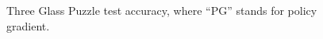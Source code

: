 	
	\begin{figure}[t!]
		\centering
		\caption{Three Glass Puzzle test accuracy, where ``PG'' stands for policy gradient.}
		\label{fig:puzzle_test_accuracy}
	\end{figure}

